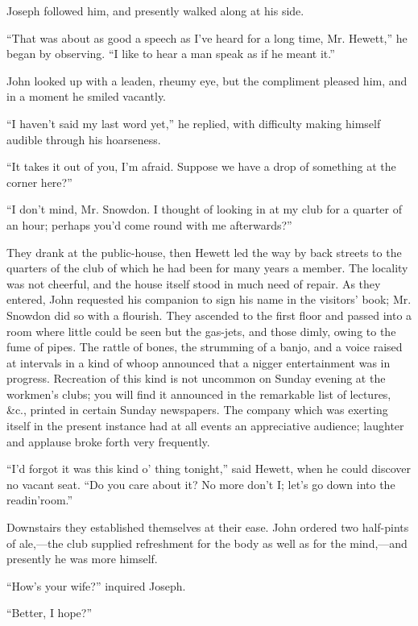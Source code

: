 Joseph followed him, and presently walked along at his side.

``That was about as good a speech as I've heard for a long time, Mr.
Hewett,'' he began by observing. ``I like to hear a man speak as if he
meant it.''

John looked up with a leaden, rheumy eye, but the compliment pleased
him, and in a moment he smiled vacantly.

``I haven't said my last word yet,'' he replied, with difficulty making
himself audible through his hoarseness.

``It takes it out of you, I'm afraid. Suppose we have a drop of
something at the corner here?''

``I don't mind, Mr. Snowdon. I thought {\protect\hypertarget{154}{}{}}of
looking in at my club for a quarter of an hour; perhaps you'd come round
with me afterwards?''

They drank at the public-house, then Hewett led the way by back streets
to the quarters of the club of which he had been for many years a
member. The locality was not cheerful, and the house itself stood in
much need of repair. As they entered, John requested his companion to
sign his name in the visitors' book; Mr. Snowdon did so with a flourish.
They ascended to the first floor and passed into a room where little
could be seen but the gas-jets, and those dimly, owing to the fume of
pipes. The rattle of bones, the strumming of a banjo, and a voice raised
at intervals in a kind of whoop announced that a nigger entertainment
was in progress. Recreation of this kind is not uncommon on Sunday
evening at the workmen's clubs; you will find it announced in the
remarkable list of lectures, \&c., printed in certain Sunday newspapers.
The company which was exerting itself in the present instance had at all
{\protect\hypertarget{155}{}{}}events an appreciative audience; laughter
and applause broke forth very frequently.

``I'd forgot it was this kind o' thing tonight,'' said Hewett, when he
could discover no vacant seat. ``Do you care about it? No more don't I;
let's go down into the readin'room.''

Downstairs they established themselves at their ease. John ordered two
half-pints of ale,---the club supplied refreshment for the body as well
as for the mind,---and presently he was more himself.

``How's your wife?'' inquired Joseph.

``Better, I hope?''


